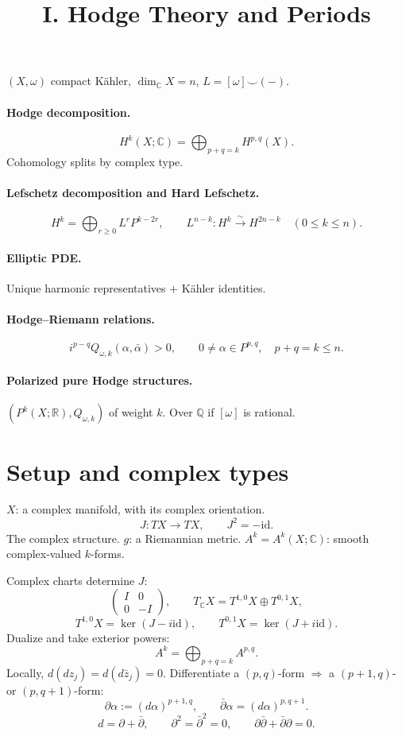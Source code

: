 \documentclass[11pt]{article}
\title{I. Hodge Theory and Periods}
\author{}
\date{}
\newcommand{\C}{\mathbb C}
\newcommand{\R}{\mathbb R}
\newcommand{\Q}{\mathbb Q}
\newcommand{\id}{\mathrm{id}}
\newcommand{\bdel}{\bar\partial}
\begin{document}
\maketitle

$(X,\omega)$ compact K\"ahler, $\dim_{\C}X=n$, $L=[\omega]\smile(-)$.

\paragraph{Hodge decomposition.}
\[
 H^k(X;\C)=\bigoplus_{p+q=k}H^{p,q}(X).
\]
Cohomology splits by complex type.

\paragraph{Lefschetz decomposition and Hard Lefschetz.}
\[
 H^k=\bigoplus_{r\geq0}L^rP^{k-2r},
 \qquad L^{n-k}:H^k\xrightarrow{\sim}H^{2n-k}
 \quad(0\leq k\leq n).
\]
\paragraph{Elliptic PDE.}
Unique harmonic representatives $+$ K\"ahler identities.

\paragraph{Hodge--Riemann relations.}
\[
 i^{p-q}Q_{\omega,k}(\alpha,\bar\alpha)>0,
 \qquad 0\neq\alpha\in P^{p,q},\quad p+q=k\leq n.
\]
\paragraph{Polarized pure Hodge structures.}
$(P^k(X;\R),Q_{\omega,k})$ of weight $k$. Over $\Q$ if $[\omega]$ is rational.

\section*{Setup and complex types}
$X$: a complex manifold, with its complex orientation.
\[
 J:TX\longrightarrow TX,\qquad J^2=-\id.
\]
The complex structure. $g$: a Riemannian metric.
$A^k=A^k(X;\C)$: smooth complex-valued $k$-forms.

Complex charts determine $J$:
\[
 \begin{pmatrix} I&0\\0&-I\end{pmatrix},
 \qquad T_{\C}X=T^{1,0}X\oplus T^{0,1}X,
\]
\[
 T^{1,0}X=\ker(J-i\id),\qquad
 T^{0,1}X=\ker(J+i\id).
\]
Dualize and take exterior powers:
\[
 A^k=\bigoplus_{p+q=k}A^{p,q}.
\]
Locally, $d(dz_j)=d(d\bar z_j)=0$. Differentiate a $(p,q)$-form
$\Rightarrow$ a $(p+1,q)$- or $(p,q+1)$-form:
\[
 \partial\alpha:=(d\alpha)^{p+1,q},\qquad
 \bdel\alpha=(d\alpha)^{p,q+1}.
\]
\[
 d=\partial+\bdel,\qquad
 \partial^2=\bdel^2=0,\qquad
 \partial\bdel+\bdel\partial=0.
\]
\end{document}
